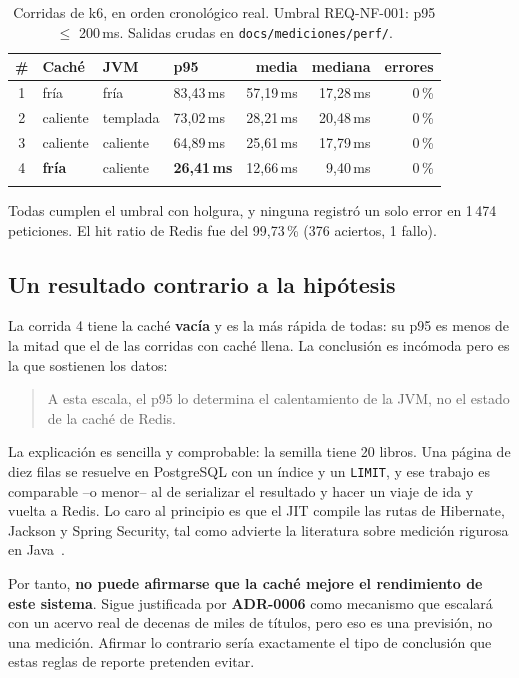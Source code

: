 \documentclass[11pt,a4paper]{article}
\newcommand{\adr}[1]{\textbf{ADR-#1}}
\begin{document}
\begin{longtable}{@{}clllrrr@{}}
\toprule
\textbf{\#} & \textbf{Caché} & \textbf{JVM} & \textbf{p95} & \textbf{media} & \textbf{mediana} & \textbf{errores} \\
\midrule
\endhead
1 & fría & fría & 83,43\,ms & 57,19\,ms & 17,28\,ms & 0\,\% \\
2 & caliente & templada & 73,02\,ms & 28,21\,ms & 20,48\,ms & 0\,\% \\
3 & caliente & caliente & 64,89\,ms & 25,61\,ms & 17,79\,ms & 0\,\% \\
4 & \textbf{fría} & caliente & \textbf{26,41\,ms} & 12,66\,ms & 9,40\,ms & 0\,\% \\
\bottomrule
\caption{Corridas de k6, en orden cronológico real. Umbral REQ-NF-001:
p95 $\le$ 200\,ms. Salidas crudas en \texttt{docs/mediciones/perf/}.}
\end{longtable}

Todas cumplen el umbral con holgura, y ninguna registró un solo error en 1\,474
peticiones. El hit ratio de Redis fue del 99,73\,\% (376 aciertos, 1 fallo).

\subsection{Un resultado contrario a la hipótesis}

La corrida 4 tiene la caché \textbf{vacía} y es la más rápida de todas: su p95 es
menos de la mitad que el de las corridas con caché llena. La conclusión es
incómoda pero es la que sostienen los datos:

\begin{quote}
A esta escala, el p95 lo determina el calentamiento de la JVM, no el estado de la
caché de Redis.
\end{quote}

La explicación es sencilla y comprobable: la semilla tiene 20 libros. Una página
de diez filas se resuelve en PostgreSQL con un índice y un \texttt{LIMIT}, y ese
trabajo es comparable --o menor-- al de serializar el resultado y hacer un viaje
de ida y vuelta a Redis. Lo caro al principio es que el JIT compile las rutas de
Hibernate, Jackson y Spring Security, tal como advierte la literatura sobre
medición rigurosa en Java~\cite{georges2007statistically}.

Por tanto, \textbf{no puede afirmarse que la caché mejore el rendimiento de este
sistema}. Sigue justificada por \adr{0006} como mecanismo que escalará con un
acervo real de decenas de miles de títulos, pero eso es una previsión, no una
medición. Afirmar lo contrario sería exactamente el tipo de conclusión que estas
reglas de reporte pretenden evitar.
\end{document}
